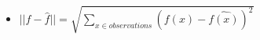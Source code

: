 \documentclass{beamer}
\begin{document}
\begin{frame}
\begin{columns}[c]
\begin{itemize}

\item[] $||f - \hat{f}|| = \sqrt{\sum\nolimits_{x \in observations}(f(x) - \hat{f(x)})^2}$ 
\end{itemize}



\begin{figure}
\centering
{}\par\medskip
{}\par\medskip        
\end{figure}

\end{columns}


\end{frame}

\end{document}
